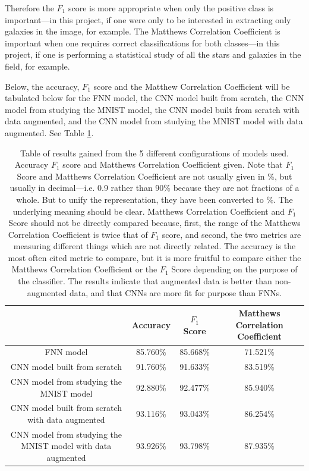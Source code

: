 \documentclass[a4paper,fleqn,usenatbib]{mnras}
\begin{document}
Therefore the $F_1$ score is more appropriate when only the positive class is important---in this project, if one were only to be interested in extracting only galaxies in the image, for example. The Matthews Correlation Coefficient is important when one requires correct classifications for both classes---in this project, if one is performing a statistical study of all the stars and galaxies in the field, for example. 

Below, the accuracy, $F_1$ score and the Matthew Correlation Coefficient will be tabulated below for the FNN model, the CNN model built from scratch, the CNN model from studying the MNIST model, the CNN model built from scratch with data augmented, and the CNN model from studying the MNIST model with data augmented. See Table \ref{table:results}.


\begin{table}
 \begin{tabular}{c||c c c||} 
 \hline
  & Accuracy & $F_1$ Score & Matthews Correlation Coefficient \\ [0.5ex] 
 \hline\hline
 FNN model & 85.760\% & 85.668\% & 71.521\% \\ 
 \hline
 CNN model built from scratch & 91.760\% & 91.633\% & 83.519\% \\
 \hline
 CNN model from studying the MNIST model & 92.880\% & 92.477\% & 85.940\% \\
 \hline
  CNN model built from scratch with data augmented & 93.116\% & 93.043\% & 86.254\% \\
 \hline
 CNN model from studying the MNIST model with data augmented & 93.926\% & 93.798\% & 87.935\% \\
 \hline
\end{tabular}
\caption{Table of results gained from the 5 different configurations of models used. Accuracy $F_	1$ score and Matthews Correlation Coefficient given. Note that $F_1$ Score and Matthews Correlation Coefficient are not usually given in \%, but usually in decimal---i.e. 0.9 rather than 90\% because they are not fractions of a whole. But to unify the representation, they have been converted to \%. The underlying meaning should be clear. Matthews Correlation Coefficient and $F_1$ Score should not be directly compared because, first, the range of the Matthews Correlation Coefficient is twice that of $F_1$ score, and second, the two metrics are measuring different things which are not directly related. The accuracy is the most often cited metric to compare, but it is more fruitful to compare either the Matthews Correlation Coefficient or the $F_1$ Score depending on the purpose of the classifier. The results indicate that augmented data is better than non-augmented data, and that CNNs are more fit for purpose than FNNs. \label{table:results}}
\end{table}
\end{document}
